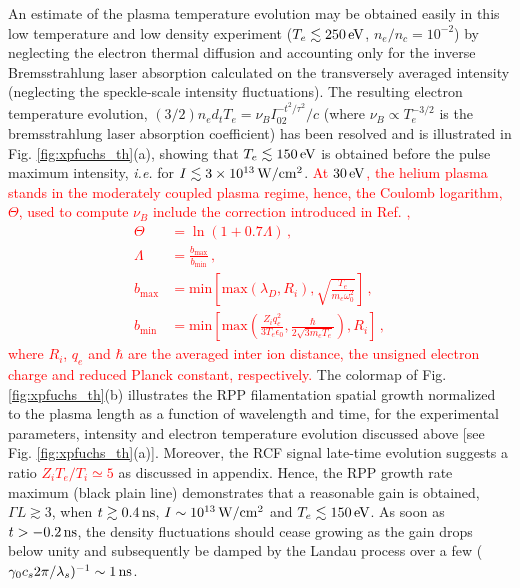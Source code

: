 \documentclass[
 reprint,
 superscriptaddress,
 amsmath,amssymb,
 aps,
]{revtex4-1}
\def\tc{\textcolor{red}}
\begin{document}
An estimate of the plasma temperature evolution may be obtained easily in this low temperature and low density experiment ($T_e\lesssim 250 \,\rm eV$, $n_e/n_c=10^{-2}$) by neglecting the electron thermal diffusion and accounting only for the inverse Bremsstrahlung laser absorption calculated on the transversely averaged intensity (neglecting the speckle-scale intensity fluctuations). The resulting electron temperature evolution, \mbox{$(3/2)n_e d_tT_e=\nu_BI_02^{-t^2/\tau^2}/c$} (where $\nu_B\propto T_e^{-3/2}$ is  the bremsstrahlung laser absorption coefficient) has been resolved and is illustrated in Fig. \ref{fig:xpfuchs_th}(a), showing that  $T_e\lesssim 150\, \rm eV $ is obtained  before the pulse maximum intensity, \emph{i.e.} for $I\lesssim 3\times 10^{13}\, \rm W/cm^2$.
\tc{
At $30\,\rm eV$, the helium plasma stands in the moderately  coupled plasma regime, hence, the Coulomb logarithm, $\Theta$, used to compute $\nu_B$ include the correction introduced in Ref. \cite[]{PRL_Baalrud_2013},
\begin{align}
\Theta &= \ln (1+0.7 \Lambda) \, , \nonumber\\
\Lambda& = \frac{b_\mathrm{max}}{b_\mathrm{min}} \,, \nonumber\\
b_\mathrm{max} &=\mathrm{min}\left[\mathrm{max}(\lambda_D,R_i),\sqrt{\frac{T_e}{m_e\omega_0^2}}\right]
\, ,\nonumber\\
b_\mathrm{min} &= \mathrm{min}\left[\mathrm{max}\left(\frac{Z_i q_e^2}{3T_e\epsilon_0},\frac{\hbar}{2\sqrt{3m_eT_e}}\right),R_i\right]
\, , \label{eq:logcoul}
\end{align}
where $R_i$, $q_e$ and $\hbar$ are the averaged inter ion distance, the unsigned electron charge and reduced Planck constant, respectively. }
The colormap of Fig. \ref{fig:xpfuchs_th}(b) illustrates the RPP filamentation spatial  growth normalized to the plasma length  as a function of   wavelength and  time, for the experimental parameters, intensity and electron temperature evolution discussed above [see Fig. \ref{fig:xpfuchs_th}(a)].
Moreover, the RCF signal late-time evolution suggests a ratio  \tc{$Z_iT_e/T_i\simeq 5$} as discussed in appendix. Hence, the RPP growth rate maximum (black plain line) demonstrates that a reasonable gain is obtained,  $\Gamma L\gtrsim 3$, when $t\gtrsim 0.4\,\rm ns$, $I\sim  10^{13}\,\rm W/cm^2$ and  $T_e\lesssim 150\, \rm eV$.
As soon as $t>-0.2\, \rm ns$, the density fluctuations should cease growing as the gain drops below unity  and subsequently be damped by the Landau process over a few ($\gamma_0c_s2\pi/\lambda_s)^{-1} \sim 1\, \rm ns$.
\end{document}

